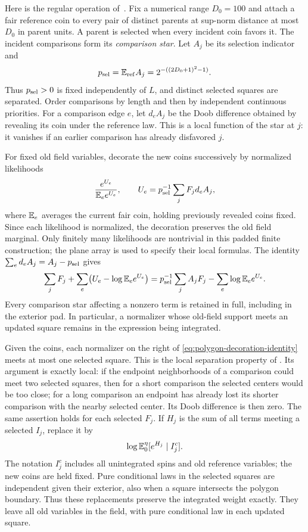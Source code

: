 Here is the regular operation of~\cite{Q}.  Fix a numerical range
$D_0=100$ and attach a fair reference coin to every pair of distinct
parents at sup-norm distance at most $D_0$ in parent units.  A parent is
selected when every incident coin favors it. The incident comparisons
form its \emph{comparison star}. Let $A_j$ be its selection
indicator and
\[
 p_{\rm sel}=\mathbb E_{\rm ref}A_j=2^{-((2D_0+1)^2-1)}.
\]
Thus $p_{\rm sel}>0$ is fixed independently of $L$, and distinct selected squares
are separated.  Order comparisons by length and then by independent
continuous priorities.  For a comparison edge $e$, let $d_eA_j$ be the
Doob difference obtained by revealing its coin under the reference
law.  This is a local function of the star at $j$: it vanishes if an
earlier comparison has already disfavored $j$.

For fixed old field variables, decorate the new coins successively by
normalized likelihoods
\begin{equation}\label{eq:polygon-decoration}
 \frac{e^{U_e}}{\mathbb E_e e^{U_e}},
 \qquad U_e=p_{\rm sel}^{-1}\sum_j F_jd_eA_j,
\end{equation}
where $\mathbb E_e$ averages the current fair coin, holding previously revealed
coins fixed.  Since each likelihood is normalized, the decoration
preserves the old field marginal. Only finitely many likelihoods are
nontrivial in this padded finite construction; the plane array is used
to specify their local formulas. The identity
$\sum_e d_eA_j=A_j-p_{\rm sel}$ gives
\begin{equation}\label{eq:polygon-decoration-identity}
 \sum_jF_j+\sum_e\bigl(U_e-\log\mathbb E_e e^{U_e}\bigr)
 =p_{\rm sel}^{-1}\sum_j A_jF_j-\sum_e\log\mathbb E_e e^{U_e}.
\end{equation}
Every comparison star affecting a nonzero term is retained in full,
including in the exterior pad.  In particular, a normalizer whose old-field support meets an
updated square remains in the expression being integrated.

Given the coins, each normalizer on the right of
\eqref{eq:polygon-decoration-identity} meets at most one selected
square. This is the local separation property of
\cite[Lemma~3.1, \emph{Separation of the terms to be integrated}]{Q}.
Its argument is exactly local: if the endpoint
neighborhoods of a comparison could meet two selected squares, then
for a short comparison the selected centers would be too close; for a
long comparison an endpoint has already lost its shorter comparison
with the nearby selected center.  Its Doob difference is then zero.
The same assertion holds for each selected $F_j$.  If $H_j$ is the sum
of all terms meeting a selected $I_j$, replace it by
\begin{equation}\label{eq:polygon-conditional-addition}
 \log\mathbb E_0^\eta[e^{H_j}\mid I_j^c].
\end{equation}
The notation $I_j^c$ includes all unintegrated spins and old reference
variables; the new coins are held fixed.  Pure conditional laws in the
selected squares are independent given their exterior, also when a
square intersects the polygon boundary.  Thus these replacements
preserve the integrated weight exactly.  They leave all old variables
in the field, with pure conditional law in each updated square.

